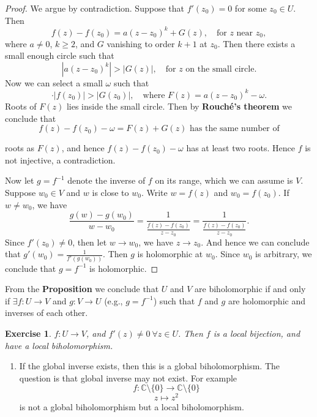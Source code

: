 \documentclass{article}
\newtheorem{exercise}{Exercise}
\begin{document}
\begin{proof}
We argue by contradiction. Suppose that $f'(z_0) = 0$ for some $z_0 \in U$. Then
$$f(z) - f(z_0) = a(z-z_0)^k + G(z), \quad \text{for } z \text{ near } z_0,$$
where $a \ne 0$, $k \ge 2$, and $G$ vanishing to order $k+1$ at $z_0$.
Then there exists a small enough circle such that
$$|a(z-z_0)^k| > |G(z)|, \quad \text{for } z \text{ on the small circle.}$$
Now we can select a small $\omega$ such that
$$\cdot |f(z_0) | > |G(z_0)|, \quad \text{where } F(z) = a(z-z_0)^k - \omega.$$
Roots of $F(z)$ lies inside the small circle.
Then by \textbf{Rouch\'e's theorem} we conclude that
$$f(z) - f(z_0) - \omega = F(z) + G(z) \text{ has the same number of}$$

roots as $F(z)$, and hence $f(z) - f(z_0) - \omega$ has at least two roots.
Hence $f$ is not injective, a contradiction.

Now let $g = f^{-1}$ denote the inverse of $f$ on its range, which we can assume is $V$. Suppose $w_0 \in V$ and $w$ is close to $w_0$. Write $w = f(z)$ and $w_0 = f(z_0)$. If $w \ne w_0$, we have
$$\frac{g(w) - g(w_0)}{w - w_0} = \frac{1}{\frac{f(z) - f(z_0)}{z - z_0}} = \frac{1}{\frac{f(z) - f(z_0)}{z - z_0}}.$$
Since $f'(z_0) \ne 0$, then let $w \to w_0$, we have $z \to z_0$.
And hence we can conclude that $g'(w_0) = \frac{1}{f'(g(w_0))}$.
Then $g$ is holomorphic at $w_0$. Since $w_0$ is arbitrary, we conclude that $g = f^{-1}$ is holomorphic.
\end{proof}

\begin{remark}
From the \textbf{Proposition} we conclude that $U$ and $V$ are biholomorphic if and only if $\exists f: U \to V$ and $g: V \to U$ (e.g., $g = f^{-1}$) such that $f$ and $g$ are holomorphic and inverses of each other.
\end{remark}

\begin{exercise}
$f: U \to V$, and $f'(z) \ne 0 \ \forall z \in U$. Then $f$ is a local bijection, and have a local biholomorphism.
\end{exercise}
\begin{enumerate}
    \item If the global inverse exists, then this is a global biholomorphism. The question is that global inverse may not exist. For example
    $$f: \mathbb{C} \setminus \{0\} \to \mathbb{C} \setminus \{0\}$$
    $$z \mapsto z^2$$
    is not a global biholomorphism
    but a local biholomorphism.
\end{enumerate}
\end{document}
